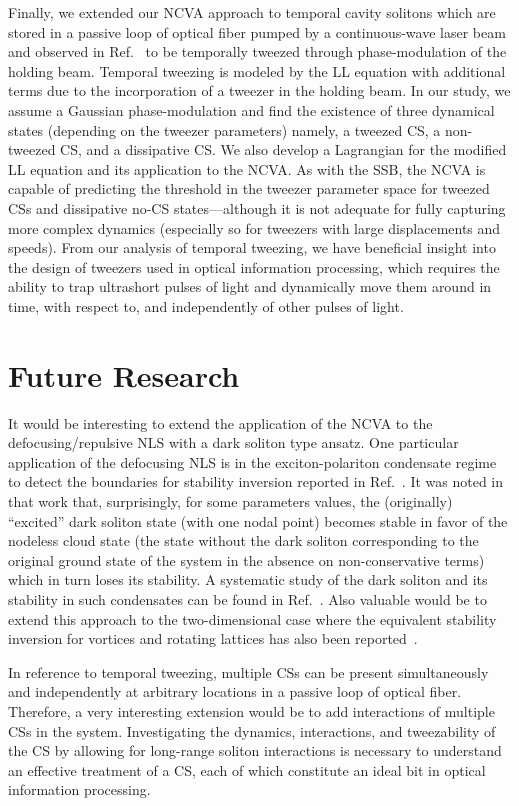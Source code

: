 Finally, we extended our NCVA approach to temporal cavity solitons which are stored in a passive loop of optical fiber pumped by a continuous-wave laser beam and observed in Ref.~\cite{tweeze} to be temporally tweezed through phase-modulation of the holding beam.  Temporal tweezing is modeled by the LL equation with additional terms due to the incorporation of a tweezer in the holding beam.  In our study, we assume a Gaussian phase-modulation and find the existence of three dynamical states (depending on the tweezer parameters) namely, a tweezed CS, a non-tweezed CS, and a dissipative CS.  We also develop a Lagrangian for the modified LL equation and its application to the NCVA.  As with the SSB, the NCVA is capable of predicting the threshold in the tweezer parameter space for tweezed CSs and dissipative no-CS states---although it is not adequate for fully capturing more complex dynamics (especially so for tweezers with large displacements and speeds).  From our analysis of temporal tweezing, we have beneficial insight into the design of tweezers used in optical information processing, which requires the ability to trap ultrashort pulses of light and dynamically move them around in time, with respect to, and independently of other pulses of light.


\section{Future Research}

It would be interesting to extend the application of the NCVA to the defocusing/repulsive NLS with a dark soliton type ansatz.  One particular application of the defocusing NLS is in the exciton-polariton condensate regime to  detect 
the boundaries for stability inversion reported 
in Ref.~\cite{ref8}. It was noted in that work that, surprisingly, 
for some parameters values, the (originally) ``excited'' dark soliton 
state (with one nodal point) becomes stable in favor of 
the nodeless cloud state (the state without the dark soliton corresponding
to the original ground state of the system in the absence on non-conservative
terms) which in turn loses its stability. A systematic study of the
dark soliton and its stability in such condensates can be found
in Ref.~\cite{smirnov}.
Also valuable would
be to extend this approach to the two-dimensional case where the equivalent 
stability inversion for vortices and rotating lattices has also
been reported~\cite{berloff1}.

In reference to temporal tweezing, multiple CSs can be present simultaneously and independently at arbitrary locations in a passive loop of optical fiber.  Therefore, a very interesting extension would be to add interactions of multiple CSs in the system.  Investigating the dynamics, interactions, and tweezability of the CS by allowing for long-range soliton interactions is necessary to understand an effective treatment of a CS, each of which constitute  an ideal bit in optical information processing.


